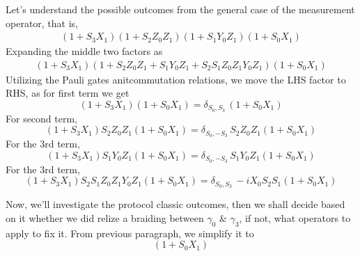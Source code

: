 \documentclass{article}
\begin{document}
Let's understand the possible outcomes from the general case of the measurement operator,
that is,
$$
	\begin{aligned}
		(1 +S_3 X_1) (1 +S_2 Z_0 Z_1) (1 +S_1 Y_0 Z_1) (1 +S_0 X_1)
		\label{eq:general meas}
	\end{aligned}
$$
Expanding the middle two factors as
$$
	\begin{aligned}
		(1 +S_3 X_1) (1 + S_2 Z_0 Z_1 + S_1 Y_0 Z_1 + S_2 S_1 Z_0 Z_1 Y_0 Z_1) (1 +S_0 X_1)
		\label{eq:expanding}
	\end{aligned}
$$
Utilizing the Pauli gates anitcommutation relations, we move the LHS factor to RHS,
as for first term we get
\begin{equation*}
	(1 +S_3 X_1) (1 +S_0 X_1) = \delta_{S_0,S_3}\, (1 +S_0 X_1)
\end{equation*}
For second term,
\begin{equation*}
	(1 +S_3 X_1) S_2 Z_0 Z_1 (1 +S_0 X_1) = \delta_{S_0,-S_3}\, S_2 Z_0 Z_1 (1 +S_0 X_1)
\end{equation*}
For the 3rd term,
\begin{equation*}
	(1 +S_3 X_1) S_1 Y_0 Z_1 (1 +S_0 X_1) = \delta_{S_0,-S_3}\, S_1 Y_0 Z_1 (1 +S_0 X_1)
\end{equation*}
For the 3rd term,
\begin{equation*}
	(1 +S_3 X_1) S_2 S_1 Z_0 Z_1 Y_0 Z_1 (1 +S_0 X_1) = \delta_{S_0,S_3}\, -i X_0 S_2 S_1 (1 +S_0 X_1)
\end{equation*}

Now, we'll investigate the protocol classic outcomes, then we shall decide based on it whether
we did relize a braiding between $ \gamma_0 $ \& $ \gamma_3 $, if not, what operators
to apply to fix it. From previous paragraph, we simplify it to
\begin{equation*}
	[
		\delta_{S_0,S_3} + \delta_{S_0,-S_3}\, S_2 Z_0 Z_1
		+ \delta_{S_0,-S_3}\, S_1 Y_0 Z_1 + \delta_{S_0,S_3}\, -i X_0 S_2 S_1
	] (1 +S_0 X_1)
\end{equation*}
\end{document}
